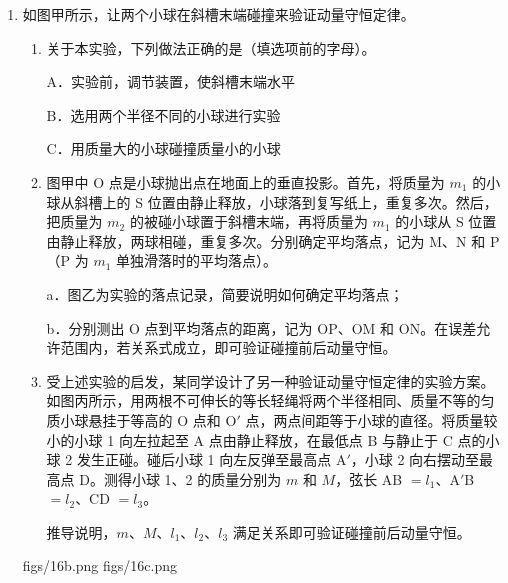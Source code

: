 \documentclass[\gkver]{gaokaozhenti}
\begin{document}
\begin{enumerate}
{故选 BC。

（3）由闭合电路欧姆定律得 $E = U + \frac{U}{R}r$，解得 $U = -\frac{U}{R}r + E$

结合题图 2 可得 $E = 1.0\UV$，$r = \frac{1.0 - 0.4}{180\times10^{-6}}\UO \approx 3.3\UkO$
}

\item
如图甲所示，让两个小球在斜槽末端碰撞来验证动量守恒定律。
\begin{enumerate}
	\item
	关于本实验，下列做法正确的是（填选项前的字母）。

	A．实验前，调节装置，使斜槽末端水平

	B．选用两个半径不同的小球进行实验

	C．用质量大的小球碰撞质量小的小球
	\item
	图甲中 O 点是小球抛出点在地面上的垂直投影。首先，将质量为 $m_{1}$ 的小球从斜槽上的 S 位置由静止释放，小球落到复写纸上，重复多次。然后，把质量为 $m_{2}$ 的被碰小球置于斜槽末端，再将质量为 $m_{1}$ 的小球从 S 位置由静止释放，两球相碰，重复多次。分别确定平均落点，记为 M、N 和 P（P 为 $m_{1}$ 单独滑落时的平均落点）。

	a．图乙为实验的落点记录，简要说明如何确定平均落点；

	b．分别测出 O 点到平均落点的距离，记为 OP、OM 和 ON。在误差允许范围内，若关系式成立，即可验证碰撞前后动量守恒。
	\item
	受上述实验的启发，某同学设计了另一种验证动量守恒定律的实验方案。如图丙所示，用两根不可伸长的等长轻绳将两个半径相同、质量不等的匀质小球悬挂于等高的 O 点和 O$'$ 点，两点间距等于小球的直径。将质量较小的小球 1 向左拉起至 A 点由静止释放，在最低点 B 与静止于 C 点的小球 2 发生正碰。碰后小球 1 向左反弹至最高点 A$'$，小球 2 向右摆动至最高点 D。测得小球 1、2 的质量分别为 $m$ 和 $M$，弦长 AB $= l_{1}$、A$'$B $= l_{2}$、CD $= l_{3}$。

	推导说明，$m$、$M$、$l_{1}$、$l_{2}$、$l_{3}$ 满足关系即可验证碰撞前后动量守恒。
\end{enumerate}

{figs/16b.png}
{figs/16c.png}
\end{enumerate}
\end{document}
